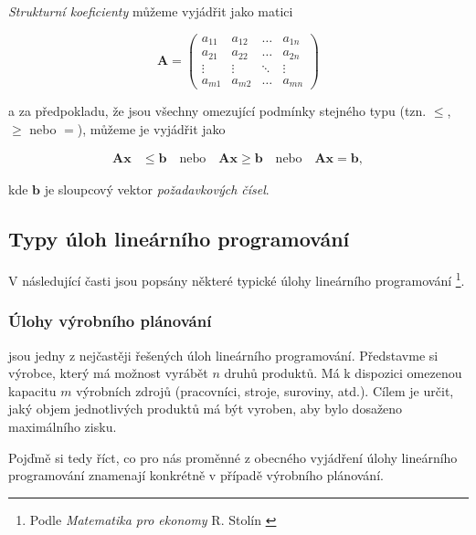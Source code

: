 \textit{Strukturní koeficienty} můžeme vyjádřit jako matici

\begin{equation}
    \bm{A} = 
    \begin{pmatrix}
        a_{11} & a_{12} & \ldots & a_{1n} \\
        a_{21} & a_{22} & \ldots & a_{2n} \\
        \vdots & \vdots & \ddots & \vdots \\
        a_{m1} & a_{m2} & \ldots & a_{mn}
    \end{pmatrix}
\end{equation}

a za předpokladu, že jsou všechny omezující podmínky stejného typu (tzn. $\leq$, $\geq$ nebo $=$), můžeme je vyjádřit jako 

\begin{equation}
    \begin{split}
        \bm{A}\bm{x} &\leq \bm{b} \quad \text{nebo} \quad 
        \bm{A}\bm{x} \geq \bm{b} \quad \text{nebo} \quad 
        \bm{A}\bm{x} = \bm{b},
    \end{split}
    \end{equation}

kde $\bm{b}$ je sloupcový vektor \textit{požadavkových čísel}.

\subsection{Typy úloh lineárního programování}

V následující časti jsou popsány některé typické úlohy lineárního programování \footnote{Podle \textit{Matematika pro ekonomy} R. Stolín \cite{matematika_pro_ekonomy}}.

\subsubsection{Úlohy výrobního plánování}
jsou jedny z nejčastěji řešených úloh lineárního programování.
Představme si výrobce, který má možnost vyrábět $n$ druhů produktů.
Má k dispozici omezenou kapacitu $m$ výrobních zdrojů (pracovníci, stroje, suroviny, atd.).
Cílem je určit, jaký objem jednotlivých produktů má být vyroben, aby bylo dosaženo maximálního zisku.

Pojďmě si tedy říct, co pro nás proměnné z obecného vyjádření úlohy lineárního programování znamenají konkrétně v případě výrobního plánování.

